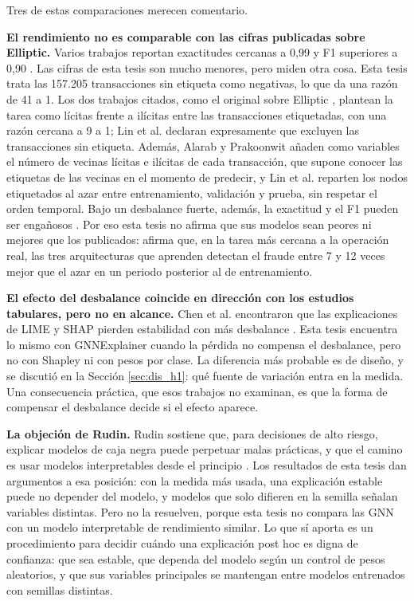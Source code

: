 Tres de estas comparaciones merecen comentario.

\textbf{El rendimiento no es comparable con las cifras publicadas sobre Elliptic.} Varios
trabajos reportan exactitudes cercanas a 0,99 y F1 superiores a 0,90
\cite{Alarab2023Recurrent, Lin2026Detecting}. Las cifras de esta tesis son mucho menores, pero
miden otra cosa. Esta tesis trata las 157.205 transacciones sin etiqueta como negativas, lo que
da una razón de 41 a 1. Los dos trabajos citados, como el original sobre Elliptic
\cite{Weber2019Elliptic}, plantean la tarea como lícitas frente a ilícitas entre las
transacciones etiquetadas, con una razón cercana a 9 a 1; Lin et al. declaran expresamente que
excluyen las transacciones sin etiqueta. Además, Alarab y Prakoonwit añaden como variables el número de vecinas lícitas e ilícitas
de cada transacción, que supone conocer las etiquetas de las vecinas en el momento de
predecir, y Lin et al. reparten los nodos etiquetados al azar entre entrenamiento, validación y
prueba, sin respetar el orden temporal. Bajo un desbalance fuerte, además, la exactitud y el F1
pueden ser engañosos \cite{Chicco2020MCC, Saito2015PR}. Por eso esta tesis no afirma que sus modelos sean peores ni
mejores que los publicados: afirma que, en la tarea más cercana a la operación real, las tres
arquitecturas que aprenden detectan el fraude entre 7 y 12 veces mejor que el azar en un periodo
posterior al de entrenamiento.

\textbf{El efecto del desbalance coincide en dirección con los estudios tabulares, pero no en
alcance.} Chen et al. encontraron que las explicaciones de LIME y SHAP pierden estabilidad con
más desbalance \cite{Chen2023CreditImbalance}. Esta tesis encuentra lo mismo con GNNExplainer
cuando la pérdida no compensa el desbalance, pero no con Shapley ni con pesos por clase. La
diferencia más probable es de diseño, y se discutió en la Sección \ref{sec:dis_h1}: qué fuente de
variación entra en la medida. Una consecuencia práctica, que esos trabajos no examinan, es que la
forma de compensar el desbalance decide si el efecto aparece.

\textbf{La objeción de Rudin.} Rudin sostiene que, para decisiones de alto riesgo, explicar
modelos de caja negra puede perpetuar malas prácticas, y que el camino es usar modelos
interpretables desde el principio \cite{Rudin2019Stop}. Los resultados de esta tesis dan
argumentos a esa posición: con la medida más usada, una explicación estable puede no depender
del modelo, y modelos que solo difieren en la semilla señalan variables distintas. Pero no la
resuelven, porque esta tesis no compara las GNN con un modelo interpretable de rendimiento
similar. Lo que sí aporta es un procedimiento para decidir cuándo una explicación post hoc es
digna de confianza: que sea estable, que dependa del modelo según un control de pesos
aleatorios, y que sus variables principales se mantengan entre modelos entrenados con semillas
distintas.

